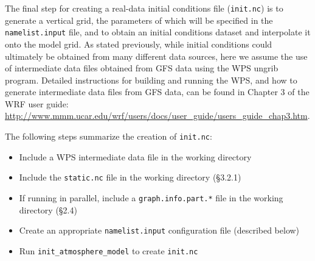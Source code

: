 The final step for creating a real-data initial conditions file ({\tt init.nc}) is to generate a vertical grid, the parameters of which will be specified in the {\tt namelist.input} file, and to obtain an initial conditions dataset and interpolate it onto the model grid. As stated previously, while initial conditions could ultimately be obtained from many different data sources, here we assume the use of intermediate data files obtained from GFS data using the WPS ungrib program.  Detailed instructions for building and running the WPS, and how to generate intermediate data files from GFS data, can be found in Chapter 3 of the WRF user guide: \\
\url{http://www.mmm.ucar.edu/wrf/users/docs/user\_guide/users\_guide\_chap3.htm}.

The following steps summarize the creation of {\tt init.nc}:

\begin{itemize}
\item Include a WPS intermediate data file in the working directory
\item Include the {\tt static.nc} file in the working directory (\S 3.2.1)
\item If running in parallel, include a {\tt graph.info.part.*} file in the working directory (\S 2.4)
\item Create an appropriate {\tt namelist.input} configuration file (described below)
\item Run {\tt init\_atmosphere\_model} to create {\tt init.nc}
\end{itemize}


